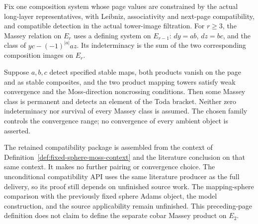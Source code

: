 \begin{theorem}
  \label{thm:moss-convergence-adapter}
  \notready
  Fix one composition system whose page values are constrained by the actual
  long-layer representatives, with Leibniz, associativity and next-page
  compatibility, and compatible detection in the actual tower-image filtration.
  For $r\ge3$, the Massey relation on $E_r$ uses a defining system on
  $E_{r-1}$: $dy=ab$, $dz=bc$, and the class of
  $yc-(-1)^{|a|}az$. Its indeterminacy is the sum of the two corresponding
  composition images on $E_r$.

  Suppose $a,b,c$ detect specified stable maps, both products vanish on the
  page and as stable composites, and the two product mapping towers satisfy
  weak convergence and the Moss-direction noncrossing conditions. Then some
  Massey class is permanent and detects an element of the Toda bracket.
  Neither zero indeterminacy nor survival of every Massey class is assumed.
  The chosen family controls the convergence range; no convergence of every
  ambient object is asserted.

  The retained compatibility package is assembled from the context of
  Definition~\ref{def:fixed-sphere-moss-context} and the literature conclusion
  on that same context. It makes no further pairing or convergence choice.
  The unconditional compatibility API uses the same literature producer as
  the full delivery, so its proof still depends on unfinished source work.
  The mapping-sphere comparison with the previously fixed sphere Adams
  object, the model construction, and the source applicability remain
  unfinished. This preceding-page definition does not claim to define the
  separate cobar Massey product on $E_2$.
\end{theorem}

